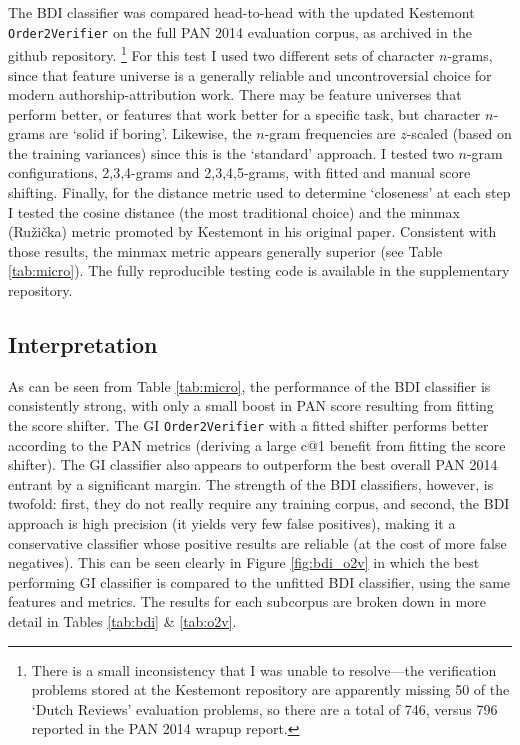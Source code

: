 \documentclass[
    hf,
]{ceurart}
\begin{document}
The BDI classifier was compared head-to-head with the updated Kestemont
\texttt{Order2Verifier} on the full PAN 2014 evaluation corpus, as archived in
the github repository.%
%
\footnote{ There is a small inconsistency that I was unable to resolve---the
    verification problems stored at the Kestemont repository are apparently
    missing 50 of the `Dutch Reviews' evaluation problems, so there are a total
    of 746, versus 796 reported in the PAN 2014 wrapup report.
}
%
For this test I used two different sets of character $n$-grams, since that
feature universe is a generally reliable and uncontroversial choice for modern
authorship-attribution work. There may be feature universes that perform better,
or features that work better for a specific task, but character $n$-grams are
`solid if boring'. Likewise, the $n$-gram frequencies are $z$-scaled (based on
the training variances) since this is the `standard' approach. I tested two
$n$-gram configurations, 2,3,4-grams and 2,3,4,5-grams, with fitted and manual
score shifting. Finally, for the distance metric used to determine `closeness'
at each step I tested the cosine distance (the most traditional choice) and the
minmax (Ružička) metric promoted by Kestemont in his original paper. Consistent
with those results, the minmax metric appears generally superior (see Table
\ref{tab:micro}). The fully reproducible testing code is available in the
supplementary repository.

\subsection{Interpretation}

As can be seen from Table \ref{tab:micro}, the performance of the BDI classifier
is consistently strong, with only a small boost in PAN score resulting from
fitting the score shifter. The GI \texttt{Order2Verifier} with a fitted shifter
performs better according to the PAN metrics (deriving a large c@1 benefit from
fitting the score shifter). The GI classifier also appears to outperform the
best overall PAN 2014 entrant by a significant margin. The strength of the BDI
classifiers, however, is twofold: first, they do not really require any training
corpus, and second, the BDI approach is high precision (it yields very few false
positives), making it a conservative classifier whose positive results are
reliable (at the cost of more false negatives). This can be seen clearly in
Figure \ref{fig:bdi_o2v} in which the best performing GI classifier is compared
to the unfitted BDI classifier, using the same features and metrics. The results
for each subcorpus are broken down in more detail in Tables \ref{tab:bdi} \&
\ref{tab:o2v}.
\end{document}
